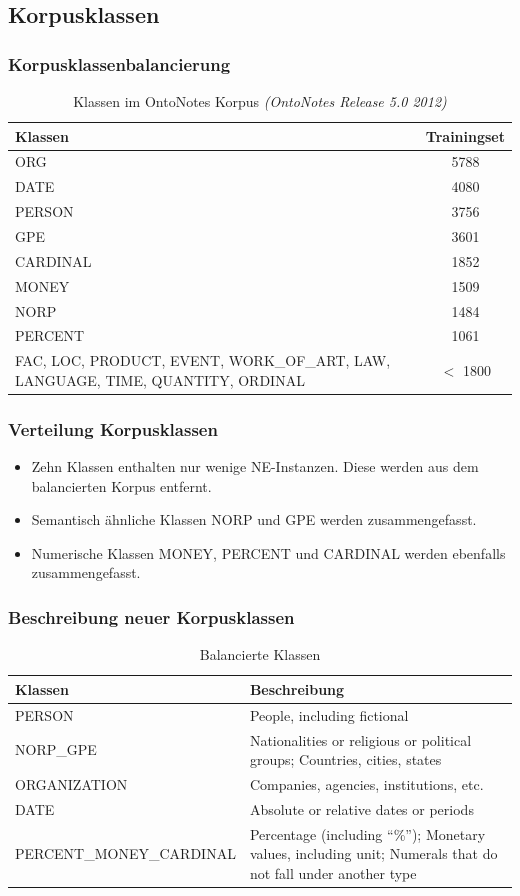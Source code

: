 \documentclass{beamer}
\begin{document}
	\subsection{Korpusklassen}
		\begin{frame}
			\frametitle{Korpusklassenbalancierung}
				\begin{table}
				\small
				\caption{Klassen im OntoNotes Korpus \textit{(OntoNotes Release 5.0 2012)}}
				\begin{tabularx}{\textwidth}{Xc}
					\toprule
					Klassen  & Trainingset \\
					\midrule
					ORG  & 5788 \\
					DATE & 4080  \\
					PERSON & 3756 \\
					GPE & 3601 \\
					CARDINAL & 1852 \\
					MONEY & 1509  \\
					NORP & 1484 \\
					PERCENT & 1061  \\
					FAC, LOC, PRODUCT, EVENT, WORK\_OF\_ART, LAW, LANGUAGE, TIME, QUANTITY, ORDINAL & $<$ 1800 \\
					\bottomrule
				\end{tabularx}

				\label{tab:datasets}
			\end{table}
		\end{frame}
			\begin{frame}
				\frametitle{Verteilung Korpusklassen}
				\begin{itemize}
					\item Zehn Klassen enthalten nur wenige NE-Instanzen. Diese werden aus dem balancierten Korpus entfernt.
					\item Semantisch ähnliche Klassen NORP und GPE werden zusammengefasst.
					\item Numerische Klassen MONEY, PERCENT und CARDINAL werden ebenfalls zusammengefasst.
				\end{itemize}
			\end{frame}
	\begin{frame}
		\frametitle{Beschreibung neuer Korpusklassen}
		\begin{table}
			\caption{Balancierte Klassen}
			\begin{tabularx}{\textwidth}{lX}
				\toprule
				Klassen  & Beschreibung \\
				\midrule
				PERSON 	& People, including fictional \\
				NORP\_GPE &	Nationalities or religious or political groups;
				Countries, cities, states\\
				ORGANIZATION &	Companies, agencies, institutions, etc.\\
				DATE &	Absolute or relative dates or periods\\
				PERCENT\_MONEY\_CARDINAL &	Percentage (including “\%”);
				Monetary values, including unit;
				Numerals that do not fall under another type \\
				\bottomrule
			\end{tabularx}
			\label{tab:datasets}
		\end{table}
	\end{frame}
\end{document}

